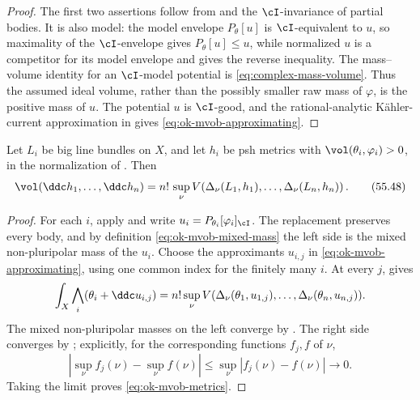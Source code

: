 \begin{proof}
The first two assertions follow from
 and the \(\cI\)-invariance of partial
bodies.  It is also model: the model envelope
\(P_\theta[u]\) is \(\cI\)-equivalent to \(u\), so maximality of the
\(\cI\)-envelope gives \(P_\theta[u]\leq u\), while normalized \(u\) is a
competitor for its model envelope and gives the reverse inequality.  The
mass--volume identity for an \(\cI\)-model potential is
\eqref{eq:complex-mass-volume}.  Thus the assumed ideal volume, rather than
the possibly smaller raw mass of \(\varphi\), is the positive mass of
\(u\).  The potential \(u\) is \(\cI\)-good, and the rational-analytic
K\"ahler-current approximation in \cite[Theorem~7.1.1]{XiaBook} gives
\eqref{eq:ok-mvob-approximating}.
\end{proof}

\begin{theorem}\label{thm:ok-mvob-metrics}
Let \(L_i\) be big line bundles on \(X\), and let \(h_i\) be psh metrics
with \(\vol(\theta_i,\varphi_i)>0\), in the normalization of
.  Then
\[
 \vol(\ddc h_1,\dots,\ddc h_n)
 =n!\,\sup_\nu V\!\left(
    \Delta_\nu(L_1,h_1),\dots,\Delta_\nu(L_n,h_n)\right).
\tag{55.48}\label{eq:ok-mvob-metrics}
\]
\end{theorem}

\begin{proof}
For each \(i\), apply  and write
\(u_i=P_{\theta_i}[\varphi_i]_{\cI}\).  The replacement preserves every
body, and by definition \eqref{eq:ok-mvob-mixed-mass} the left side is the
mixed non-pluripolar mass of the \(u_i\).  Choose the approximants
\(u_{i,j}\) in \eqref{eq:ok-mvob-approximating}, using one common index for
the finitely many \(i\).  At every \(j\),
 gives
\[
 \int_X\bigwedge_i(\theta_i+\ddc u_{i,j})
 =n!\sup_\nu V(\Delta_\nu(\theta_1,u_{1,j}),\ldots,
                    \Delta_\nu(\theta_n,u_{n,j})).
\]
The mixed non-pluripolar masses on the left converge by
\cite[Theorem~6.2.1]{XiaBook}.  The right side converges by
; explicitly, for the corresponding functions
\(f_j,f\) of \(\nu\),
\[
 \left|\sup_\nu f_j(\nu)-\sup_\nu f(\nu)\right|
 \leq\sup_\nu|f_j(\nu)-f(\nu)|\longrightarrow0.
\]
Taking the limit proves \eqref{eq:ok-mvob-metrics}.
\end{proof}

